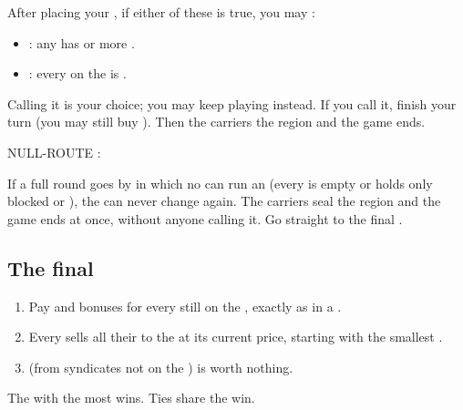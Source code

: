After placing your , if either of these is true, you may :

\begin{itemize}
  \item {}: any  has  or more .
  \item {}: every  on the  is .
\end{itemize}

Calling it is your choice; you may keep playing instead. If you call it, finish your turn (you may still buy ).
Then the carriers  the region and the game ends.


\begin{terminal}
[!] NULL-ROUTE : 
\end{terminal}

\begin{note}{\MakeUppercase{}}
If a full round goes by in which no  can run an  (every  is empty or holds only blocked or
 ), the  can never change again. The carriers seal the region and the game ends
at once, without anyone calling it. Go straight to the final .
\end{note}

\subsection{The final }
\begin{enumerate}
  \item Pay  and  bonuses for every  still on the , exactly as in a .
  \item Every  sells all their  to the  at its current price, starting with the smallest .
  \item {}  (from syndicates not on the ) is worth nothing.
\end{enumerate}
The  with the most  wins. Ties share the win.

